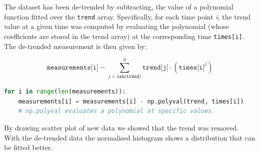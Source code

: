\documentclass[10pt,a4paper]{article}
\begin{document}

The dataset has been de-trended by subtracting, the value of a polynomial function fitted over the \texttt{trend} array. Specifically, for each time point \emph{i}, the trend value at a given time was computed by evaluating the polynomial (whose coefficients are stored in the trend array) at the corresponding time \texttt{times[i]}. The de-trended measurement is then given by:

\begin{equation*}
  \texttt{measurements[i]} - \sum_{j = \texttt{len(trend)}}^{0}{\texttt{trend[j]} \cdot (\texttt{times[i]}^j)}
\end{equation*}

\begin{lstlisting}[language=python]
for i in range(len(measurements)):
    measurements[i] = measurements[i] - np.polyval(trend, times[i])
    # np.polyval evaluates a polynomial at specific values.
\end{lstlisting}

By drawing scatter plot of new data we showed that the trend was removed. With the de-trended data the normalised histogram shows a distribution that can be fitted better.
\end{document}
